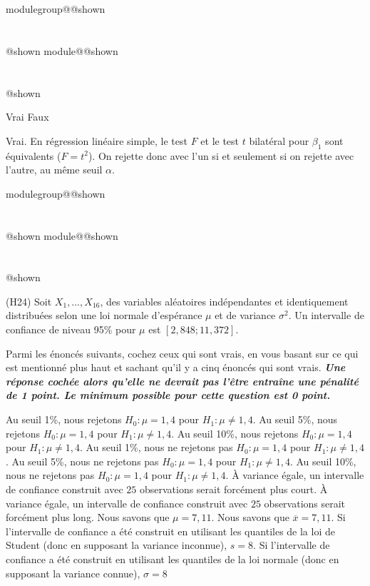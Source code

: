 \documentclass{Evaluation}
\makeatletter
\newcommand{\currentmodulekey}{}
\newcommand{\currentmoduletitle}{}
\newcommand{\currentgroupkey}{}
\newcommand{\currentgrouptitle}{}
\newcommand{\showmoduleifneeded}{%
  \ifx\currentgroupkey\empty\else
    \expandafter\ifx\csname modulegroup@\currentgroupkey @shown\endcsname\relax
      \section*{\currentgrouptitle}%
      \expandafter\gdef\csname modulegroup@\currentgroupkey @shown\endcsname{1}%
    \fi
  \fi
  \expandafter\ifx\csname module@\currentmodulekey @shown\endcsname\relax
    \section*{\currentmoduletitle}%
    \expandafter\gdef\csname module@\currentmodulekey @shown\endcsname{1}%
  \fi
}
\newenvironment{H24}{\showmoduleifneeded}{}
\makeatother
\begin{document}
\begin{questions}
\begin{H24}
\begin{parts}
\begin{oneparcheckboxes}
    \correctchoice Vrai
    \choice Faux
\end{oneparcheckboxes}

\begin{solution}
Vrai. En régression linéaire simple, le test $F$ et le test $t$ bilatéral pour $\beta_1$ sont équivalents ($F = t^2$). On rejette donc avec l'un si et seulement si on rejette avec l'autre, au même seuil $\alpha$.
\end{solution}

\end{parts}
\end{H24}

\begin{H24}
\question (H24)
Soit $X_1,\hdots,X_{16}$, des variables aléatoires indépendantes et identiquement distribuées selon une loi normale d'espérance $\mu$ et de variance $\sigma^2$. Un intervalle de confiance de niveau 95\% pour $\mu$ est $[2,848 ; 11,372]$.

Parmi les énoncés suivants, cochez ceux qui sont vrais, en vous basant sur ce qui est mentionné plus haut et sachant qu'il y a cinq énoncés qui sont vrais. \textit{\textbf{Une réponse cochée alors qu'elle ne devrait pas l'être entraîne une pénalité de 1 point. Le minimum possible pour cette question est 0 point.}}
    

    \begin{checkboxes}
        \choice Au seuil 1\%, nous rejetons $H_0: \mu=1,4$ pour $H_1:\mu \neq 1,4$.
        \CorrectChoice Au seuil 5\%, nous rejetons $H_0: \mu=1,4$ pour $H_1:\mu \neq 1,4$.
        \correctchoice Au seuil 10\%, nous rejetons $H_0: \mu=1,4$ pour $H_1:\mu \neq 1,4$.
        \choice Au seuil 1\%, nous ne rejetons pas $H_0: \mu=1,4$ pour $H_1:\mu \neq 1,4$.
        \choice Au seuil 5\%, nous ne rejetons pas $H_0: \mu=1,4$ pour $H_1:\mu \neq 1,4$.
        \choice Au seuil 10\%, nous ne rejetons pas $H_0: \mu=1,4$ pour $H_1:\mu \neq 1,4$.
        \correctchoice À variance égale, un intervalle de confiance construit avec $25$ observations serait forcément plus court.
        \choice À variance égale, un intervalle de confiance construit avec $25$ observations serait forcément plus long.
        \choice Nous savons que $\mu=7,11$.
        \correctchoice Nous savons que $\overline{x}=7,11$.
        \correctchoice Si l'intervalle de confiance a été construit en utilisant les quantiles de la loi de Student (donc en supposant la variance inconnue), $s=8$.
        \choice Si l'intervalle de confiance a été construit en utilisant les quantiles de la loi normale (donc en supposant la variance connue), $\sigma =8$
    \end{checkboxes}


\end{H24}
\end{questions}
\end{document}
